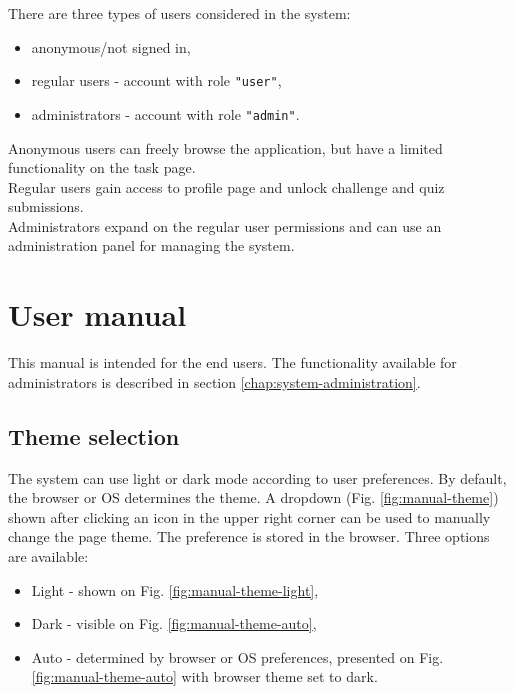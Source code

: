 There are three types of users considered in the system:
\begin{itemize}
    \item anonymous/not signed in,
    \item regular users - account with role \texttt{"user"},
    \item administrators - account with role \texttt{"admin"}.
\end{itemize}

Anonymous users can freely browse the application, but have a limited functionality on the task page.\\
Regular users gain access to profile page and unlock challenge and quiz submissions.\\
Administrators expand on the regular user permissions and can use an administration panel for managing the system.

\section{User manual}

This manual is intended for the end users. The functionality available for administrators is described in section \ref{chap:system-administration}.

\subsection{Theme selection}

The system can use light or dark mode according to user preferences. By default, the browser or OS determines the theme. A dropdown (Fig. \ref{fig:manual-theme}) shown after clicking an icon in the upper right corner can be used to manually change the page theme. The preference is stored in the browser. Three options are available:

\begin{itemize}
    \item Light - shown on Fig. \ref{fig:manual-theme-light},
    \item Dark - visible on Fig. \ref{fig:manual-theme-auto},
    \item Auto - determined by browser or OS preferences, presented on Fig. \ref{fig:manual-theme-auto} with browser theme set to dark.
\end{itemize}

